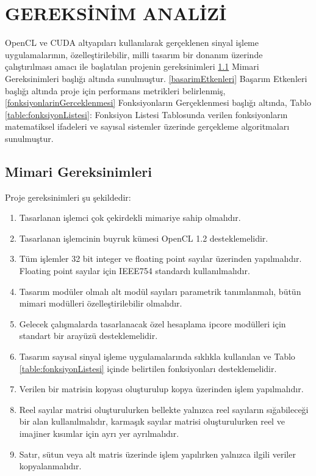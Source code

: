 \chapter{GEREKSİNİM ANALİZİ} \label{chapter:gereksinimAnalizi}
OpenCL ve CUDA altyapıları kullanılarak gerçeklenen sinyal işleme uygulamalarının, özelleştirilebilir, milli tasarım bir donanım üzerinde çalıştırılması amacı ile başlatılan projenin gereksinimleri \ref{projeGereksinimleri} Mimari Gereksinimleri başlığı altında sunulmuştur. \ref{basarimEtkenleri} Başarım Etkenleri başlığı altında proje için performans metrikleri belirlenmiş, \ref{fonksiyonlarinGerceklenmesi} Fonksiyonların Gerçeklenmesi başlığı altında, Tablo \ref{table:fonksiyonListesi}: Fonksiyon Listesi Tablosunda verilen fonksiyonların matematiksel ifadeleri ve sayısal sistemler üzerinde gerçekleme algoritmaları sunulmuştur.

\section{Mimari Gereksinimleri} \label{projeGereksinimleri}
 Proje gereksinimleri şu şekildedir: 
\begin{enumerate}
  \item Tasarlanan işlemci çok çekirdekli mimariye sahip olmalıdır.
  \item Tasarlanan işlemcinin buyruk kümesi OpenCL 1.2 desteklemelidir. 
  \item Tüm işlemler 32 bit integer ve floating point sayılar üzerinden yapılmalıdır. Floating point sayılar için IEEE754 standardı kullanılmalıdır.
  \item Tasarım modüler olmalı alt modül sayıları parametrik tanımlanmalı, bütün mimari modülleri özelleştirilebilir olmalıdır. 
  \item Gelecek çalışmalarda tasarlanacak özel hesaplama ipcore modülleri için standart bir arayüzü desteklemelidir.
  \item Tasarım sayısal sinyal işleme uygulamalarında sıklıkla kullanılan ve Tablo \ref{table:fonksiyonListesi} içinde belirtilen fonksiyonları desteklemelidir.
  \item Verilen bir matrisin kopyası oluşturulup kopya üzerinden işlem yapılmalıdır.
  \item Reel sayılar matrisi oluşturulurken bellekte yalnızca reel sayıların sığabileceği bir alan kullanılmalıdır, karmaşık sayılar matrisi oluşturulurken reel ve imajiner kısımlar için ayrı yer ayrılmalıdır.
  \item Satır, sütun veya alt matris üzerinde işlem yapılırken yalnızca ilgili veriler kopyalanmalıdır.
  	
\end{enumerate}

